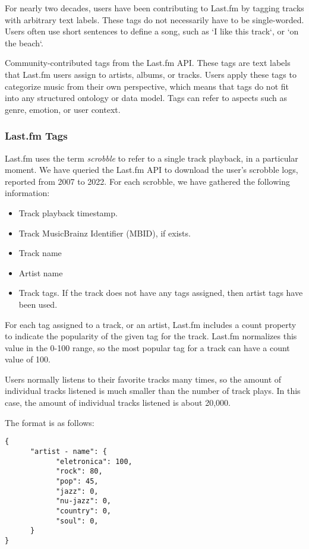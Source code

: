 \documentclass[sn-mathphys]{sn-jnl}%
\theoremstyle{thmstyleone}%
\theoremstyle{thmstyletwo}%
\theoremstyle{thmstylethree}%
\begin{document}
For nearly two decades, users have been contributing to Last.fm by tagging tracks with arbitrary text labels.
These tags do not necessarily have to be single-worded.
Users often use short sentences to define a song, such as `I like this track`, or `on the beach`.

Community-contributed tags from the Last.fm API.
These tags are text labels that Last.fm users assign
to artists, albums, or tracks. Users apply these tags to
categorize music from their own perspective, which
means that tags do not fit into any structured ontology
or data model. Tags can refer to aspects such as genre,
emotion, or user context.

\subsubsection{Last.fm Tags}
Last.fm uses the term \emph{scrobble} to refer to a single track playback,
in a particular moment. We have queried the Last.fm
API to download the user{'}s scrobble logs, reported from 2007 to 2022.
For each scrobble, we have gathered the following information:

\begin{itemize}
     \item Track playback timestamp.
     \item Track MusicBrainz Identifier (MBID), if exists.
     \item Track name
     \item Artist name
     \item Track tags. If the track does not have any tags assigned,
      then artist tags have been used.
\end{itemize}


For each tag assigned to a track, or an artist, Last.fm includes
a count property to indicate the popularity of the given tag for the track.
Last.fm normalizes this value in the 0-100 range, so the most popular tag for a track can have a
count value of 100.

Users normally listens to their favorite tracks many times,
so the amount of individual tracks listened is much smaller
than the number of track plays. In this case, the amount of
individual tracks listened is about 20,000.

The format is as follows:

\begin{verbatim}
{
      "artist - name": {
            "eletronica": 100,
            "rock": 80,
            "pop": 45,
            "jazz": 0,
            "nu-jazz": 0,
            "country": 0,
            "soul": 0,
      }
}
\end{verbatim}
\end{document}
